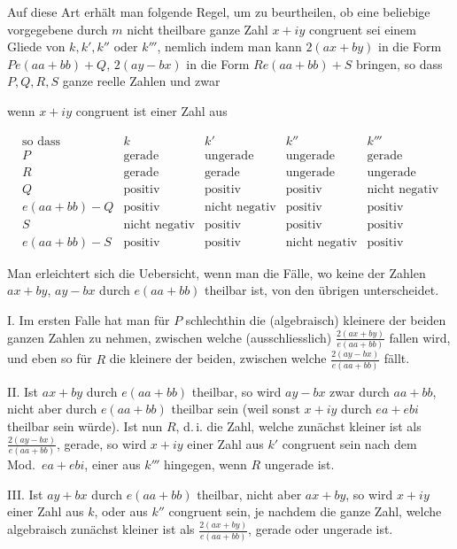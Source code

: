 Auf diese Art erhält man folgende Regel, um zu beurtheilen, ob eine beliebige vorgegebene durch $m$ nicht theilbare ganze Zahl $x+iy$ congruent sei einem Gliede von $k,k',k''$ oder $k'''$, nemlich indem man kann $2(ax+by)$ in die Form $Pe(aa+bb)+Q$, $2(ay-bx)$ in die Form $Re(aa+bb)+S$ bringen, so dass $P,Q,R,S$ ganze reelle Zahlen und zwar

\begin{center}wenn $x+iy$ congruent ist einer Zahl aus\end{center}
\begingroup\small\setlength{\arraycolsep}{3pt}
\[
\begin{array}{l||l|l|l|l}
\text{so dass}&k&k'&k''&k'''\\
P&\text{gerade}&\text{ungerade}&\text{ungerade}&\text{gerade}\\
R&\text{gerade}&\text{gerade}&\text{ungerade}&\text{ungerade}\\
Q&\text{positiv}&\text{positiv}&\text{positiv}&\text{nicht negativ}\\
e(aa+bb)-Q&\text{positiv}&\text{nicht negativ}&\text{positiv}&\text{positiv}\\
S&\text{nicht negativ}&\text{positiv}&\text{positiv}&\text{positiv}\\
e(aa+bb)-S&\text{positiv}&\text{positiv}&\text{nicht negativ}&\text{positiv}
\end{array}
\]
\endgroup

Man erleichtert sich die Uebersicht, wenn man die Fälle, wo keine der Zahlen $ax+by$, $ay-bx$ durch $e(aa+bb)$ theilbar ist, von den übrigen unterscheidet.

I. Im ersten Falle hat man für $P$ schlechthin die (algebraisch) kleinere der beiden ganzen Zahlen zu nehmen, zwischen welche (ausschliesslich) $\frac{2(ax+by)}{e(aa+bb)}$ fallen wird, und eben so für $R$ die kleinere der beiden, zwischen welche $\frac{2(ay-bx)}{e(aa+bb)}$ fällt.

II. Ist $ax+by$ durch $e(aa+bb)$ theilbar, so wird $ay-bx$ zwar durch $aa+bb$, nicht aber durch $e(aa+bb)$ theilbar sein (weil sonst $x+iy$ durch $ea+ebi$ theilbar sein würde). Ist nun $R$, d.\,i. die Zahl, welche zunächst kleiner ist als $\frac{2(ay-bx)}{e(aa+bb)}$, gerade, so wird $x+iy$ einer Zahl aus $k'$ congruent sein nach dem Mod.\ $ea+ebi$, einer aus $k'''$ hingegen, wenn $R$ ungerade ist.

III. Ist $ay+bx$ durch $e(aa+bb)$ theilbar, nicht aber $ax+by$, so wird $x+iy$ einer Zahl aus $k$, oder aus $k''$ congruent sein, je nachdem die ganze Zahl, welche algebraisch zunächst kleiner ist als $\frac{2(ax+by)}{e(aa+bb)}$, gerade oder ungerade ist.

